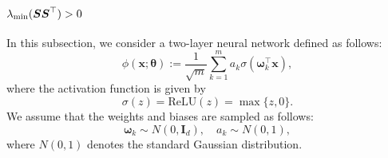 

\subsection{\( \lambda_{\text{min}}(\boldsymbol{S}\boldsymbol{S}^{\top}) > 0 \)}\label{ss}
In this subsection, we consider a two-layer neural network defined as follows:
\begin{equation}
    \phi(\boldsymbol{x};\boldsymbol{\theta}) := \frac{1}{\sqrt{m}} \sum_{k=1}^{m} a_k \sigma (\boldsymbol{\omega}_k^{\top} \boldsymbol{x}),
\end{equation}
where the activation function is given by
\begin{equation}
    \sigma(z) = \text{ReLU}(z) = \max\{z,0\}.
\end{equation}
We assume that the weights and biases are sampled as follows: 
\begin{equation}
    \boldsymbol{\omega}_k \sim N\left(0, \boldsymbol{I}_d\right), \quad a_k \sim N(0,1),
\end{equation}
where \( N(0,1) \) denotes the standard Gaussian distribution.


